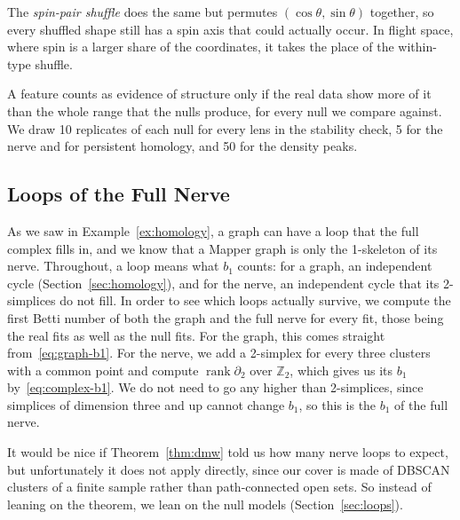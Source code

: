 \documentclass[11pt]{article}
\newcommand{\Z}{\mathbb{Z}}
\DeclareMathOperator{\rank}{rank}
\theoremstyle{definition}
\theoremstyle{remark}
\begin{document}
The \emph{spin-pair shuffle} does the same but permutes $(\cos\theta, \sin\theta)$ together, so every shuffled shape still has a spin axis that could actually occur. In flight space, where spin is a larger share of the coordinates, it takes the place of the within-type shuffle.

A feature counts as evidence of structure only if the real data show more of it than the whole range that the nulls produce, for every null we compare against.
We draw 10 replicates of each null for every lens in the stability check, 5 for the nerve and for persistent homology, and 50 for the density peaks.

\subsection{Loops of the Full Nerve}\label{sec:nerveloops}
As we saw in Example~\ref{ex:homology}, a graph can have a loop that the full complex fills in, and we know that a Mapper graph is only the 1-skeleton of its nerve.
Throughout, a loop means what $b_1$ counts: for a graph, an independent cycle (Section~\ref{sec:homology}), and for the nerve, an independent cycle that its 2-simplices do not fill.
In order to see which loops actually survive, we compute the first Betti number of both the graph and the full nerve for every fit, those being the real fits as well as the null fits.
For the graph, this comes straight from~\eqref{eq:graph-b1}.
For the nerve, we add a 2-simplex for every three clusters with a common point and compute $\rank \partial_2$ over $\Z_2$, which gives us its $b_1$ by~\eqref{eq:complex-b1}.
We do not need to go any higher than 2-simplices, since simplices of dimension three and up cannot change $b_1$, so this is the $b_1$ of the full nerve.

It would be nice if Theorem~\ref{thm:dmw} told us how many nerve loops to expect, but unfortunately it does not apply directly, since our cover is made of DBSCAN clusters of a finite sample rather than path-connected open sets. So instead of leaning on the theorem, we lean on the null models (Section~\ref{sec:loops}).
\end{document}
